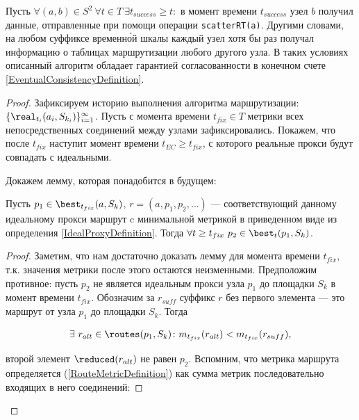 \begin{theorem}
\label{RoutingEventualConsistencyTheorem}
    Пусть $\forall (a, b) \in S^2\ \forall t \in T\ \exists t_{success} \geq t \colon$ в момент времени $t_{success}$ узел $b$ получил данные, отправленные при помощи операции \texttt{scatterRT(a)}. Другими словами, на любом суффиксе временн\'{о}й шкалы каждый узел хотя бы раз получал информацию о таблицах маршрутизации любого другого узла. В таких условиях описанный алгоритм обладает гарантией согласованности в конечном счете \ref{EventualConsistencyDefinition}.
\end{theorem}
\begin{proof}
    Зафиксируем историю выполнения алгоритма маршрутизации: \\
    $\{\real_{t_i}(a_i, S_{k_i})\}_{i = 1}^{\infty}$. Пусть с момента времени $t_{fix} \in T$ метрики всех непосредственных соединений между узлами зафиксировались. Покажем, что после $t_{fix}$ наступит момент времени $t_{EC} \geq t_{fix}$, с которого реальные прокси будут совпадать с идеальными.
    
    Докажем лемму, которая понадобится в будущем:
    
    \begin{lemma}
    \label{IdealChain}
        Пусть $p_1 \in \best_{t_{fix}}(a, S_k)$, $r = (a, p_1, p_2, \ldots )$ --- соответствующий данному идеальному прокси маршрут c минимальной метрикой в приведенном виде из определения \ref{IdealProxyDefinition}. Тогда $\forall t \geq t_{fix}\ p_2 \in \best_t(p_1, S_k)$.
    \end{lemma}
    \begin{proof}
        Заметим, что нам достаточно доказать лемму для момента времени $t_{fix}$, т.к. значения метрики после этого остаются неизменными. Предположим противное: пусть $p_2$ не является идеальным прокси узла $p_1$ до площадки $S_k$ в момент времени $t_{fix}$. Обозначим за $r_{suff}$ суффикс $r$ без первого элемента --- это маршрут от узла $p_1$ до площадки $S_k$. Тогда
        
        \begin{equation*}
        \begin{aligned}
            \exists\ r_{alt} \in \routes(p_1, S_k) \colon m_{t_{fix}}(r_{alt}) < m_{t_{fix}}(r_{suff}),
        \end{aligned}
        \end{equation*}
        
         второй элемент $\reduced(r_{alt})$ не равен $p_2$. Вспомним, что метрика маршрута определяется (\ref{RouteMetricDefinition}) как сумма метрик последовательно входящих в него соединений:
        

\end{proof}
\end{proof}
